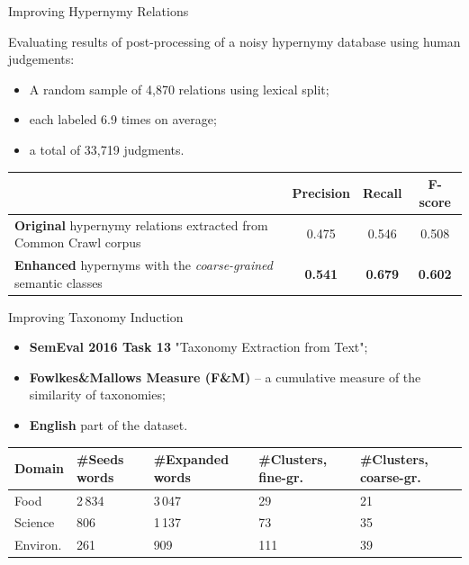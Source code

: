 \documentclass[usenames,dvipsnames]{beamer}
\begin{document}
\begin{frame}{ Improving Hypernymy Relations }

Evaluating results of post-processing of a noisy hypernymy database using human judgements:


\begin{itemize}
	\item A random sample of 4,870 relations using lexical split; 
	\item each labeled 6.9 times on average;
	\item a total of 33,719 judgments.
\end{itemize}

\pause 

\begin{table}
\footnotesize
\centering

\begin{tabular}{p{6cm}|c|c|c}
 & \textbf{Precision} & \textbf{Recall} & \textbf{F-score} \\ \toprule
\textbf{\alert{Original}} hypernymy relations extracted from Common Crawl corpus~\cite{seitner2016large} & 0.475 & 0.546 & 0.508 \\ \midrule 
\textbf{\alert{Enhanced}} hypernyms with the \textit{coarse-grained} semantic classes   & \textbf{0.541} & \textbf{0.679} & \textbf{0.602} \\ 
\end{tabular}

\end{table}

\end{frame}


\begin{frame}{ Improving Taxonomy Induction }

\begin{itemize}
	\item \textbf{SemEval 2016 Task 13} "Taxonomy Extraction from Text";
	\item \textbf{Fowlkes\&Mallows Measure (F\&M)} -- a cumulative measure of the similarity of taxonomies;
	\item \textbf{English} part of the dataset.
\end{itemize}

\pause 



\begin{table}
\footnotesize
\centering
\begin{tabular}{l|p{0.9cm}|p{1.4cm}|p{1.3cm}|p{1.5cm}}
\textbf{Domain} & \textbf{\#Seeds words} & \textbf{\#Expanded words} & \textbf{\#Clusters}, fine-gr. & \textbf{\#Clusters}, coarse-gr.  \\ \toprule
Food & 2\,834 & 3\,047 & 29 & 21 \\
Science & 806 & 1\,137 & 73 & 35 \\
Environ. & 261 & 909 & 111 & 39 \\
\end{tabular}
\end{table}


\end{frame}
\end{document}
